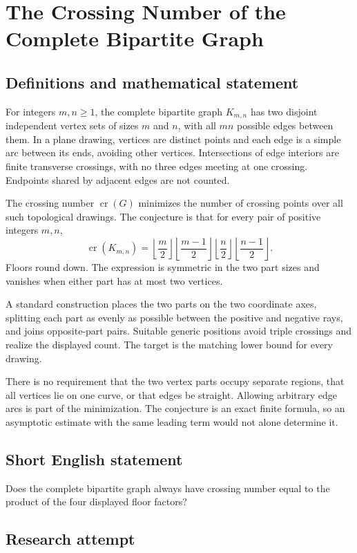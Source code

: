 \documentclass[11pt,a4paper]{article}
\begin{document}
\section*{The Crossing Number of the Complete Bipartite Graph}\label{statement}

\subsection{Definitions and mathematical statement}
For integers $m,n\ge1$, the complete bipartite graph $K_{m,n}$ has
two disjoint independent vertex sets of sizes $m$ and $n$, with all
$mn$ possible edges between them. In a plane drawing, vertices are
distinct points and each edge is a simple arc between its ends,
avoiding other vertices. Intersections of edge interiors are finite
transverse crossings, with no three edges meeting at one crossing.
Endpoints shared by adjacent edges are not counted.

The crossing number $\operatorname{cr}(G)$ minimizes the number of
crossing points over all such topological drawings. The conjecture
is that for every pair of positive integers $m,n$,
\[
 \operatorname{cr}(K_{m,n})=
       \left\lfloor\frac m2\right\rfloor
       \left\lfloor\frac{m-1}2\right\rfloor
       \left\lfloor\frac n2\right\rfloor
       \left\lfloor\frac{n-1}2\right\rfloor.
\]
Floors round down. The expression is symmetric in the two part sizes
and vanishes when either part has at most two vertices.

A standard construction places the two parts on the two coordinate
axes, splitting each part as evenly as possible between the positive
and negative rays, and joins opposite-part pairs. Suitable generic
positions avoid triple crossings and realize the displayed count.
The target is the matching lower bound for every drawing.

There is no requirement that the two vertex parts occupy separate
regions, that all vertices lie on one curve, or that edges be
straight. Allowing arbitrary edge arcs is part of the minimization.
The conjecture is an exact finite formula, so an asymptotic estimate
with the same leading term would not alone determine it.
\subsection{Short English statement}
Does the complete bipartite graph always have crossing number equal to the product of the four displayed floor factors?
\subsection{Research attempt}
\end{document}
